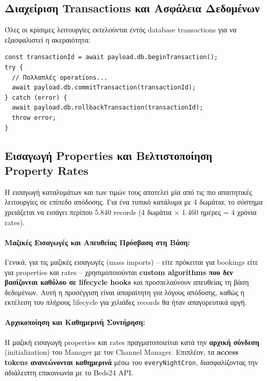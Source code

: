 \documentclass[
	12pt, %
	oneside, %
	greek,
	onehalfspacing, %
	liststotoc, %
	toctotoc, %
	parskip, %
	headsepline, %
]{MastersDoctoralThesis} %
\newcommand{\code}[1]{\texttt{#1}}
\begin{document}
\subsection{Διαχείριση Transactions και Ασφάλεια Δεδομένων}
\label{subsec:transactions}

Όλες οι κρίσιμες λειτουργίες εκτελούνται εντός database transactions για να εξασφαλιστεί η ακεραιότητα:

\begin{lstlisting}[caption={Χρήση Transactions}]
const transactionId = await payload.db.beginTransaction();
try {
  // Πολλαπλές operations...
  await payload.db.commitTransaction(transactionId);
} catch (error) {
  await payload.db.rollbackTransaction(transactionId);
  throw error;
}
\end{lstlisting}

\subsection{Εισαγωγή Properties και Βελτιστοποίηση Property Rates}
\label{subsec:property-import}

Η εισαγωγή καταλυμάτων και των τιμών τους αποτελεί μία από τις πιο απαιτητικές λειτουργίες σε επίπεδο απόδοσης. Για ένα τυπικό κατάλυμα με 4 δωμάτια, το σύστημα χρειάζεται να εισάγει περίπου 5.840 records (4 δωμάτια $\times$ 1.460 ημέρες = 4 χρόνια rates).

\paragraph{Μαζικές Εισαγωγές και Απευθείας Πρόσβαση στη Βάση:}

Γενικά, για τις μαζικές εισαγωγές (mass imports) -- είτε πρόκειται για bookings είτε για properties και rates -- χρησιμοποιούνται \textbf{custom algorithms που δεν βασίζονται καθόλου σε lifecycle hooks} και προσπελαύνουν απευθείας τη βάση δεδομένων. Αυτή η προσέγγιση είναι απαραίτητη για λόγους απόδοσης, καθώς η εκτέλεση του πλήρους lifecycle για χιλιάδες records θα ήταν απαγορευτικά αργή.

\paragraph{Αρχικοποίηση και Καθημερινή Συντήρηση:}

Η μαζική εισαγωγή properties και rates πραγματοποιείται κατά την \textbf{αρχική σύνδεση} (initialization) του Manager με τον Channel Manager. Επιπλέον, τα \textbf{access tokens ανανεώνονται καθημερινά} μέσω του \code{everyNightCron}, διασφαλίζοντας την αδιάλειπτη επικοινωνία με το Beds24 API.
\end{document}
